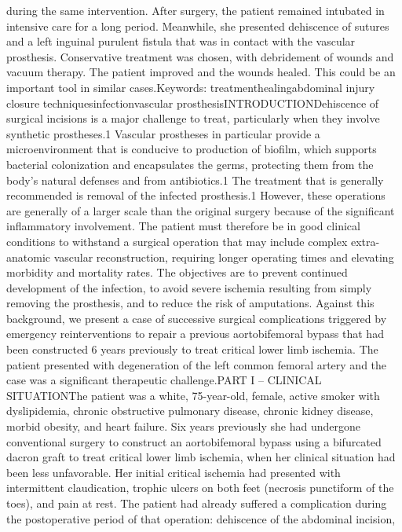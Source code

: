 \documentclass[numberinsection,times,10pt,spreadimages]{memoir}
\begin{document}
during the same intervention. After surgery, the patient remained intubated in
intensive care for a long period. Meanwhile, she presented dehiscence of sutures
and a left inguinal purulent fistula that was in contact with the vascular
prosthesis. Conservative treatment was chosen, with debridement of wounds and
vacuum therapy. The patient improved and the wounds healed. This could be an
important tool in similar cases.Keywords: treatmenthealingabdominal injury
closure techniquesinfectionvascular prosthesisINTRODUCTIONDehiscence of surgical
incisions is a major challenge to treat, particularly when
they involve synthetic prostheses.1 Vascular prostheses in particular provide a
microenvironment that is conducive to production of biofilm, which supports
bacterial colonization and encapsulates the germs, protecting them from the
body’s natural defenses and from antibiotics.1 The treatment that is generally
recommended is
removal of the infected prosthesis.1 However, these operations are generally of
a larger
scale than the original surgery because of the significant inflammatory
involvement. The patient must therefore be in good clinical conditions to
withstand a surgical operation that may include complex extra-anatomic vascular
reconstruction, requiring longer operating times and elevating morbidity and
mortality rates. The objectives are to prevent continued development of the
infection, to avoid severe ischemia resulting from simply removing the
prosthesis, and to reduce the risk of amputations. Against this background, we
present a case of successive surgical complications triggered by emergency
reinterventions to repair a previous aortobifemoral bypass that had been
constructed 6 years previously to treat critical lower limb ischemia. The
patient presented with degeneration of the left common femoral artery and the
case was a significant therapeutic challenge.PART I – CLINICAL SITUATIONThe
patient was a white, 75-year-old, female, active smoker with dyslipidemia,
chronic obstructive pulmonary disease, chronic kidney disease, morbid obesity,
and heart failure. Six years previously she had undergone conventional surgery
to construct an aortobifemoral bypass using a bifurcated dacron graft to treat
critical lower limb ischemia, when her clinical situation had been less
unfavorable. Her initial critical ischemia had presented with intermittent
claudication, trophic ulcers on both feet (necrosis punctiform of the toes), and
pain at rest. The patient had already suffered a complication during the
postoperative period of that operation: dehiscence of the abdominal incision,
\end{document}
